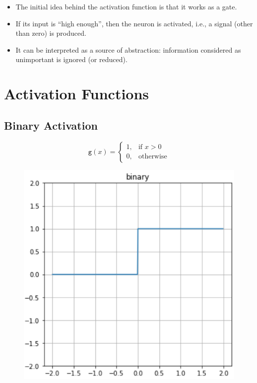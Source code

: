 \documentclass{book}
\newcommand{\act}{\texttt{g}}%
\begin{document}
\begin{itemize}
\item The initial idea behind the activation function is that it works as a gate.
\item If its input is ``high enough'', then the neuron is activated, i.e., a signal (other than zero) is produced.
\item It can be interpreted as a source of abstraction: information considered as unimportant is ignored (or reduced).
\end{itemize}

\section{Activation Functions}

\subsection{Binary Activation}

\begin{figure}[h]
    \centering
    \begin{minipage}{.5\textwidth}
        \[
        \act(x)=
        \begin{cases}
        1, & \text{if } x > 0\\
        0, & \text{otherwise}
        \end{cases}
        \]
    \end{minipage}%
    \begin{minipage}{.5\textwidth}
        \centering
        \includegraphics[width=.8\textwidth]{act_bin.png}
    \end{minipage}
\end{figure}
\end{document}
